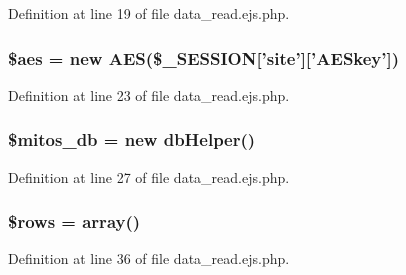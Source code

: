 \-Definition at line 19 of file data\-\_\-read.\-ejs.\-php.

\hypertarget{miscellaneous_2myaccount_2data__read_8ejs_8php_ab30046a94291cd07e400855e9c786ef3}{
\subsubsection[{\$aes}]{\setlength{\rightskip}{0pt plus 5cm}\$aes = new {\bf \-A\-E\-S}(\$\-\_\-\-S\-E\-S\-S\-I\-O\-N\mbox{[}'site'\mbox{]}\mbox{[}'\-A\-E\-Skey'\mbox{]})}}\label{miscellaneous_2myaccount_2data__read_8ejs_8php_ab30046a94291cd07e400855e9c786ef3}


\-Definition at line 23 of file data\-\_\-read.\-ejs.\-php.

\hypertarget{miscellaneous_2myaccount_2data__read_8ejs_8php_ab5d961f93efe4e2e8d8374f01dd6c65a}{
\subsubsection[{\$mitos\-\_\-db}]{\setlength{\rightskip}{0pt plus 5cm}\$mitos\-\_\-db = new {\bf db\-Helper}()}}\label{miscellaneous_2myaccount_2data__read_8ejs_8php_ab5d961f93efe4e2e8d8374f01dd6c65a}


\-Definition at line 27 of file data\-\_\-read.\-ejs.\-php.

\hypertarget{miscellaneous_2myaccount_2data__read_8ejs_8php_ace2ec39e7df3899fa8df9640ec274b03}{
\subsubsection[{\$rows}]{\setlength{\rightskip}{0pt plus 5cm}\$rows = array()}}\label{miscellaneous_2myaccount_2data__read_8ejs_8php_ace2ec39e7df3899fa8df9640ec274b03}


\-Definition at line 36 of file data\-\_\-read.\-ejs.\-php.

